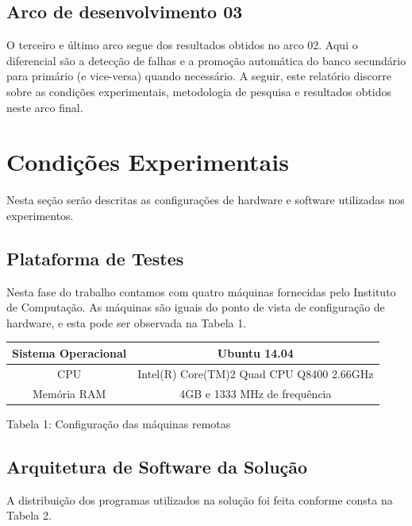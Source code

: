 \documentclass[11pt,twoside]{article}
\begin{document}
\subsection{Arco de desenvolvimento 03}

    O terceiro e último arco segue dos resultados obtidos no arco 02. Aqui o diferencial são a detecção de falhas e a promoção automática do banco secundário para primário (e vice-versa) quando necessário. A seguir, este relatório discorre sobre as condições experimentais, metodologia de pesquisa e resultados obtidos neste arco final.

\setlength{\parindent}{4ex}


\section{Condições Experimentais}
\setlength{\parindent}{4ex}
     Nesta se\c{c}\~ao ser\~ao descritas as configura\c{c}\~oes de hardware e software utilizadas nos experimentos.

\subsection{Plataforma de Testes}

     Nesta fase do trabalho contamos com quatro máquinas fornecidas pelo Instituto de Computação. As máquinas são iguais do ponto de vista de configuração de hardware, e esta pode ser observada na Tabela 1.
     
    \begin{center}
        \begin{tabular} { | c || c |}
        \hline
        Sistema Operacional & Ubuntu 14.04 \\ \hline
        CPU & Intel(R) Core(TM)2 Quad CPU Q8400 2.66GHz \\ \hline
        Memória RAM & 4GB e 1333 MHz de frequência \\ 
        \hline
        \end{tabular}

        Tabela 1: Configuração das máquinas remotas
    \end{center}

\subsection{Arquitetura de Software da Solução}

    A distribuição dos programas utilizados na solução foi feita conforme consta na Tabela 2.
\end{document}
